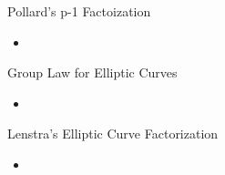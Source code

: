 \documentclass{beamer}
\begin{document}
	\begin{frame}{Pollard's p-1 Factoization}
		\begin{itemize}
			\item 
		\end{itemize}
	\end{frame}
	
	\begin{frame}{Group Law for Elliptic Curves}
		\begin{itemize}
			\item
		\end{itemize}
	\end{frame}
	
	\begin{frame}{Lenstra's Elliptic Curve Factorization}
		\begin{itemize}
			\item
		\end{itemize}
	\end{frame}
\end{document}
